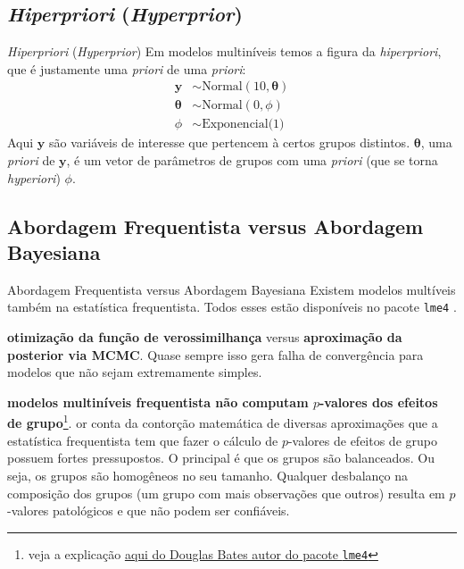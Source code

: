 \subsection{\textit{Hiperpriori} (\textit{Hyperprior})}
\begin{frame}{\textit{Hiperpriori} (\textit{Hyperprior})}
    Em modelos multiníveis temos a figura da \textit{hiperpriori}, que é
    justamente uma \textit{priori} de uma \textit{priori}:
    $$
    \begin{aligned}
        \boldsymbol{y} &\sim \text{Normal}(10, \boldsymbol{\theta}) \\
        \boldsymbol{\theta} &\sim \text{Normal}(0, \phi) \\
        \phi &\sim \text{Exponencial(1)}
    \end{aligned}
    $$
    Aqui $\boldsymbol{y}$ são variáveis de interesse que pertencem à certos
    grupos distintos. $\boldsymbol{\theta}$, uma \textit{priori} de $\boldsymbol{y}$,
    é um vetor de parâmetros de grupos com uma \textit{priori} (que se torna \textit{hyperiori})
    $\phi$.
\end{frame}

\subsection{Abordagem Frequentista versus Abordagem Bayesiana}
\begin{frame}{Abordagem Frequentista versus Abordagem Bayesiana}
  Existem modelos multíveis também na estatística frequentista.
  Todos esses estão disponíveis no pacote \texttt{lme4} \parencite{lme4}.
  \begin{vfilleditems}
    \item \textbf{otimização da função de verossimilhança} versus \textbf{aproximação da posterior via MCMC}.
    Quase sempre isso gera falha de convergência para modelos que não sejam extremamente
    simples.
    \item \textbf{modelos multiníveis frequentista não computam $p$-valores dos efeitos de grupo}\footnote{veja a explicação \href{https://stat.ethz.ch/pipermail/r-help/2006-May/094765.html}{aqui do Douglas Bates autor do pacote \texttt{lme4}}}.
    or conta da contorção matemática de diversas aproximações que a estatística
    frequentista tem que fazer o cálculo de $p$-valores de efeitos de
    grupo possuem fortes pressupostos. O principal é que os grupos são balanceados.
    Ou seja, os grupos são homogêneos no seu tamanho.
    Qualquer desbalanço na composição dos grupos (um grupo com mais observações que outros) resulta em
    $p$-valores patológicos e que não podem ser confiáveis.
  \end{vfilleditems}
\end{frame}

